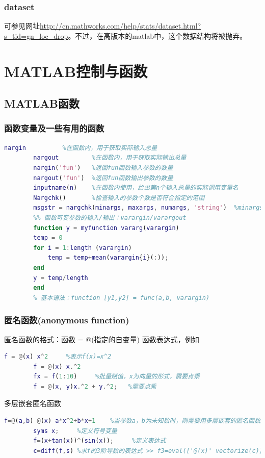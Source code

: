     \subsection{dataset}
            可参见网址\url{http://cn.mathworks.com/help/stats/dataset.html?s_tid=gn_loc_drop}。不过，在高版本的matlab中，这个数据结构将被抛弃。

\chapter{MATLAB控制与函数}
\section{MATLAB函数}
    \subsection{函数变量及一些有用的函数}
        \par
        \begin{lstlisting}[language=Matlab]
        nargin          %在函数内，用于获取实际输入总量
        nargout         %在函数内，用于获取实际输出总量
        nargin('fun')   %返回fun函数输入参数的数量
        nargout('fun')  %返回fun函数输出参数的数量
        inputname(n)    %在函数内使用，给出第n个输入总量的实际调用变量名
        Nargchk()       %检查输入的参数个数是否符合指定的范围
        msgstr = nargchk(minargs, maxargs, numargs, 'string')  %minargs和maxargs分别为参数个数的最小值最大值，numargs为求得的输入项的项数，可直接为函数nargin如果输入变量个数超出范围，则返回错误信息；如果变量个数在范围内则返回空矩阵。
        %% 函数可变参数的输入/输出：varargin/varargout
        function y = myfunction vararg(varargin)
        temp = 0
        for i = 1:length (varargin)
            temp = temp+mean(varargin{i}(:));
        end
        y = temp/length
        end
        % 基本语法：function [y1,y2] = func(a,b, varargin)
        \end{lstlisting}
    \subsection{匿名函数(anonymous function)}
        匿名函数的格式：函数 = $@$(指定的自变量) 函数表达式，例如
        \begin{lstlisting}[language=Matlab]
        f = @(x) x^2     %表示f(x)=x^2
        f = @(x) x.^2
        fx = f(1:10)     %批量赋值，x为向量的形式，需要点乘
        f = @(x, y)x.^2 + y.^2;   %需要点乘
        \end{lstlisting}
        多层嵌套匿名函数
        \begin{lstlisting}[language=Matlab]
        f=@(a,b) @(x) a*x^2+b*x+1    %当参数a，b为未知数时，则需要用多层嵌套的匿名函数来表示。
        syms x;     %定义符号变量
        f=(x+tan(x))^(sin(x));     %定义表达式
        c=diff(f,s) %求f的3阶导数的表达式 >> f3=eval(['@(x)' vectorize(c)]);    %vectorize函数的功能是使内联函 数适合数组运算的法则。
        \end{lstlisting}

